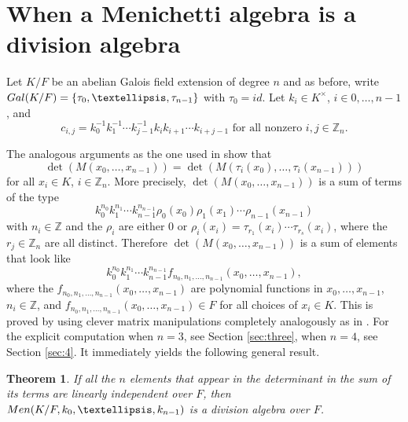 \documentclass[11pt]{amsart}
\theoremstyle{plain}
\newtheorem{theorem}{Theorem}[section]
\theoremstyle{definition}
\begin{document}
%
\section{When a Menichetti algebra is a division algebra}\label{sec:results}
%


 Let  $K/F$ be an abelian Galois field extension  of degree $n$ and as before, write ${\rm Gal}(K/F)=\{ \tau_0,\dots,\tau_{n-1} \}$ with $\tau_0=id$.
Let $k_i\in K^\times$, $i\in 0,\dots,{n-1}$, and
$$c_{i,j}=k_0^{-1}k_1^{-1} \cdots    k_{j-1}^{-1}   k_ik_{i+1}\cdots k_{i+j-1} \text{ for all nonzero } i,j\in \mathbb{Z}_n.$$

 The analogous arguments as the one used in \cite[Proposition 1]{M} show that
 $$\det (M(x_0,\dots,x_{n-1}))=\det (M(\tau_i(x_0),\dots,\tau_i(x_{n-1})))$$
  for all $x_i\in K$, $i\in\mathbb{Z}_n$. More precisely,
$\det (M(x_0, \dots,x_{n-1}))$ is  a sum of terms of the type
$$k_0^{n_0}k_1^{n_1} \cdots k_{n-1}^{n_{n-1}} \rho_0(x_0)\rho_1(x_1)\cdots \rho_{n-1}(x_{n-1})$$
with $n_i\in\mathbb{Z}$ and the $\rho_i$ are either 0 or $\rho_i(x_i)=\tau_{r_1} (x_i)\cdots \tau_{r_s}(x_i) $, where the $r_j\in\mathbb{Z}_n$ are all distinct. Therefore
$\det (M(x_0, \dots,x_{n-1}))$ is  a sum of elements that look like
$$k_0^{n_0} k_1^{n_1} \cdots k_{n-1}^{n_{n-1}} f_{n_0, n_1,\dots, n_{n-1}}(x_0,\dots,x_{n-1}),$$
where the $f_{n_0, n_1,\dots, n_{n-1}}(x_0,\dots,x_{n-1})$ are polynomial functions in $x_0,\dots,x_{n-1}$, $n_i\in \mathbb{Z}$, and
$f_{n_0, n_1,\dots, n_{n-1}}(x_0,\dots,x_{n-1})\in F$ for all choices of $x_i\in K$.
This is proved by using clever matrix manipulations completely analogously as in
 \cite[Corollary 1]{M}. For the explicit computation when $n=3$, see Section \ref{sec:three}, when $n=4$, see Section \ref{sec:4}. It immediately yields the following general result.


 \begin{theorem}
If all the $n$ elements
that appear in the determinant  in the sum of its terms are linearly independent over $F$, then ${\rm Men}(K/F, k_0,\dots,k_{n-1})$ is a division algebra over $F$.
 \end{theorem}
\end{document}
